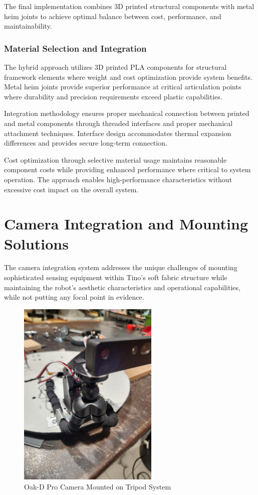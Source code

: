 The final implementation combines 3D printed structural components with metal heim joints to achieve optimal balance between cost, performance, and maintainability.

\subsubsection{Material Selection and Integration}

The hybrid approach utilizes 3D printed PLA components for structural framework elements where weight and cost optimization provide system benefits. Metal heim joints provide superior performance at critical articulation points where durability and precision requirements exceed plastic capabilities.

Integration methodology ensures proper mechanical connection between printed and metal components through threaded interfaces and proper mechanical attachment techniques. Interface design accommodates thermal expansion differences and provides secure long-term connection.

Cost optimization through selective material usage maintains reasonable component costs while providing enhanced performance where critical to system operation. The approach enables high-performance characteristics without excessive cost impact on the overall system.

\section{Camera Integration and Mounting Solutions}

The camera integration system addresses the unique challenges of mounting sophisticated sensing equipment within Tino's soft fabric structure while maintaining the robot's aesthetic characteristics and operational capabilities, while not putting any focal point in evidence.

\begin{figure}[H]
    \centering
    \includegraphics[width=0.6\textwidth, angle=-90]{Images/TripodOnHeadCamera.jpg}
    \caption{Oak-D Pro Camera Mounted on Tripod System}
    \label{fig:tripod_camera_mount}
\end{figure}

